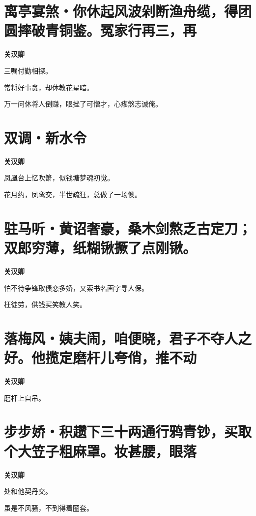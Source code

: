 \documentclass[12pt,a4paper]{ctexbook}
\begin{document}
\section{离亭宴煞・你休起风波剁断渔舟缆，得团圆摔破青铜鉴。冤家行再三，再}
\textbf{关汉卿}\par\vspace{0.5em}
三嘱付勤相探。\par
常将好事贪，却休教花星暗。\par
万一问休将人倒赚，眼挫了可憎才，心疼煞志诚俺。\par

\section{双调・新水令}
\textbf{关汉卿}\par\vspace{0.5em}
凤凰台上忆吹箫，似钱塘梦魂初觉。\par
花月约，凤鸾交，半世疏狂，总做了一场懊。\par

\section{驻马听・黄诏奢豪，桑木剑熬乏古定刀；双郎穷薄，纸糊锹撅了点刚锹。}
\textbf{关汉卿}\par\vspace{0.5em}
怕不待争锋取债恋多娇，又索书名画字寻人保。\par
枉徒劳，供钱买笑教人笑。\par

\section{落梅风・姨夫闹，咱便晓，君子不夺人之好。他揽定磨杆儿夸俏，推不动}
\textbf{关汉卿}\par\vspace{0.5em}
磨杆上自吊。\par

\section{步步娇・积趱下三十两通行鸦青钞，买取个大笠子粗麻罩。妆甚腰，眼落}
\textbf{关汉卿}\par\vspace{0.5em}
处和他契丹交。\par
虽是不风骚，不到得着圈套。\par
\end{document}
